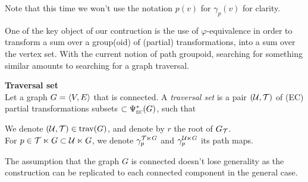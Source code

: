 \begin{remark}
Note that this time we won't use the notation $p(v)$ for $\gamma_p(v)$ for clarity.
\end{remark}

One of the key object of our contruction is the use of $\varphi$-equivalence in order to transform a sum over a group(oid) of (partial) transformations, into a sum over the vertex set. With the current notion of path groupoid, searching for something similar amounts to searching for a graph traversal.

\begin{definition}\textbf{Traversal set}\\
Let a graph $G = \langle V, E \rangle$ that is connected. A \emph{traversal set} is a pair $(\mathcal{U}, \mathcal{T})$ of (EC) partial transformations subsets $\subset \Psi_{\operatorname{\textsc{ec}}}^*(G)$, such that
We denote $(\mathcal{U}, \mathcal{T}) \in \operatorname{trav}(G)$, and denote by $r$ the root of $G_{\mathcal{T}}$.\\
For $p \in \mathcal{T} \ltimes G \subset \mathcal{U} \ltimes G$, we denote $\gamma_p^{\mathcal{T} \ltimes G}$ and $\gamma_p^{\mathcal{U} \ltimes G}$ its path maps.
\end{definition}

\begin{remark}The assumption that the graph $G$ is connected doesn't lose generality as the construction can be replicated to each connected component in the general case.
\end{remark}

